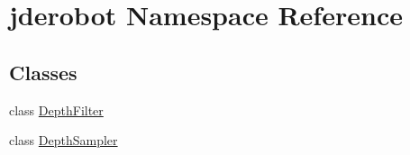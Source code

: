 \hypertarget{namespacejderobot}{}\section{jderobot Namespace Reference}
\label{namespacejderobot}
\subsection*{Classes}
\begin{DoxyCompactItemize}
\item 
class \hyperlink{classjderobot_1_1_depth_filter}{Depth\+Filter}
\item 
class \hyperlink{classjderobot_1_1_depth_sampler}{Depth\+Sampler}
\end{DoxyCompactItemize}
